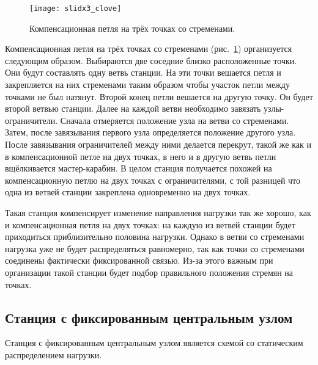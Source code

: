 \documentclass[fleqn, 12pt]{extarticle}
\begin{document}
    \begin{figure}[h]
        \centering
        \texttt{[image: slidx3\_clove]}
        \caption{Компенсационная петля на трёх точках со стременами.}\label{fig:slidx3_clove}
    \end{figure}
    Компенсационная петля на трёх точках со стременами (рис.~\ref{fig:slidx3_clove}) организуется следующим образом. Выбираются две соседние близко расположенные точки. Они будут составлять
    одну ветвь станции. На эти точки вешается петля и закрепляется на них стременами таким образом чтобы участок петли между точками не был натянут. Второй конец петли вешается на другую точку.
    Он будет второй ветвью станции. Далее на каждой ветви необходимо завязать узлы-ограничители. Сначала отмеряется положение узла на ветви со стременами. Затем, после завязывания
    первого узла определяется положение другого узла. После завязывания ограничителей между ними делается перекрут, такой же как и в компенсационной петле на двух точках, в него и в другую
    ветвь петли вщёлкивается мастер-карабин. В целом станция получается похожей на компенсационную петлю на двух точках с ограничителями, с той разницей что одна из ветвей станции
    закреплена одновременно на двух точках.
    
    Такая станция компенсирует изменение направления нагрузки так же хорошо,
    как и компенсационная петля на двух точках: на каждую из ветвей станции будет приходиться приблизительно половина нагрузки. Однако в ветви со стременами нагрузка уже не будет
    распределяться равномерно, так как точки со стременами соединены фактически фиксированной связью. Из-за этого важным при организации такой станции будет подбор правильного
    положения стремян на точках.

\subsection{Станция с фиксированным центральным узлом}\label{sec:cordelette}
    Станция с фиксированным центральным узлом является схемой со статическим распределением нагрузки.
\end{document}
